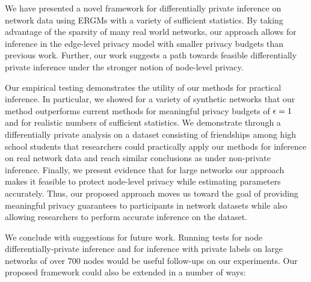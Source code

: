 We have presented a novel framework for differentially private inference on network data using ERGMs with a variety of sufficient statistics. By taking advantage of the sparsity of many real world networks, our approach allows for inference in the edge-level privacy model with smaller privacy budgets than previous work. Further, our work suggests a path towards feasible differentially private inference under the stronger notion of node-level privacy. 

Our empirical testing demonstrates the utility of our methods for practical inference. In particular, we showed for a variety of synthetic networks that our method outperforms current methods for meaningful privacy budgets of $\epsilon=1$ and for realistic numbers of sufficient statistics. We demonstrate through a differentially private analysis on a dataset consisting of friendships among high school students that researchers could practically apply our methods for inference on real network data and reach similar conclusions as under non-private inference. Finally, we present evidence that for large networks our approach makes it feasible to protect node-level privacy while estimating parameters accurately. Thus, our proposed approach moves us toward the goal of providing meaningful privacy guarantees to participants in network datasets while also allowing researchers to perform accurate inference on the dataset.  

We conclude with suggestions for future work. Running tests for node differentially-private inference and for inference with private labels on large networks of over $700$ nodes would be useful follow-ups on our experiments. Our proposed framework could also be extended in a number of ways:

